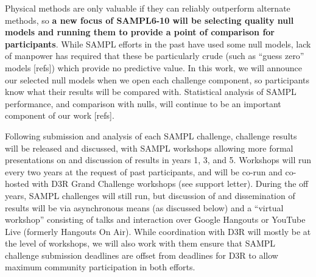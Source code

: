 \documentclass[11pt]{article}
\begin{document}
Physical methods are only valuable if they can reliably outperform alternate methods, so \textbf{a new focus of SAMPL6-10 will be selecting quality null models and running them to provide a point of comparison for participants}.
While SAMPL efforts in the past have used some null models, lack of manpower has required that these be particularly crude (such as ``guess zero'' models [refs]) which provide no predictive value. 
In this work, we will announce our selected null models when we open each challenge component, so participants know what their results will be compared with.
Statistical analysis of SAMPL performance, and comparison with nulls, will continue to be an important component of our work [refs].

Following submission and analysis of each SAMPL challenge, challenge results will be released and discussed, with SAMPL workshops allowing more formal presentations on and discussion of results in years 1, 3, and 5. 
Workshops will run every two years at the request of past participants, and will be co-run and co-hosted with D3R Grand Challenge workshops (see support letter).
During the off years, SAMPL challenges will still run, but discussion of and dissemination of results will be via asynchronous means (as discussed below) and a ``virtual workshop'' consisting of talks and interaction over Google Hangouts or YouTube Live (formerly Hangouts On Air).
While coordination with D3R will mostly be at the level of workshops, we will also work with them ensure that SAMPL challenge submission deadlines are offset from deadlines for D3R to allow maximum community participation in both efforts.
\end{document}
